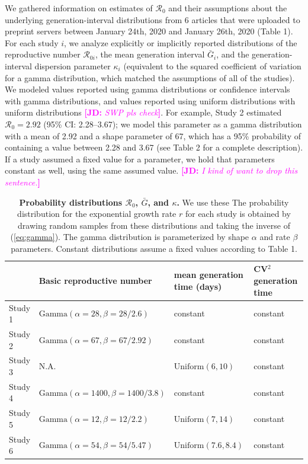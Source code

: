 \documentclass[12pt]{article}
\newcommand{\eref}[1]{(\ref{eq:#1})}
\newcommand{\comment}[3]{\textcolor{#1}{\textbf{[#2: }\textsl{#3}\textbf{]}}}
\newcommand{\jd}[1]{\comment{magenta}{JD}{#1}}
\begin{document}
We gathered information on estimates of $\mathcal R_0$ and their assumptions about the underlying generation-interval distributions from 6 articles that were uploaded to preprint servers between January 24th, 2020 and January 26th, 2020 (Table 1).
For each study $i$, we analyze explicitly or implicitly reported distributions of the reproductive number $\mathcal R_{0i}$, the mean generation interval $\bar G_i$, and the generation-interval dispersion parameter $\kappa_i$ (equivalent to the squared coefficient of variation for a gamma distribution, which matched the assumptions of all of the studies).
We modeled values reported using gamma distributions or confidence intervals with gamma distributions, and values reported using uniform distributions with uniform distributions \jd{SWP pls check}.
For example, Study 2 estimated $\mathcal R_0 = 2.92$ (95\% CI: 2.28--3.67);
we model this parameter as a gamma distribution with a mean of 2.92 and a shape parameter of 67, which has a 95\% probability of containing a value between 2.28 and 3.67 (see Table 2 for a complete description).
If a study assumed a fixed value for a parameter, we hold that parameters constant as well, using the same assumed value. \jd{I kind of want to drop this sentence.}

\begin{table}[t]
\begin{center}
\footnotesize
\begin{tabular}{l|l|l|l}
 & Basic reproductive number & mean generation time (days) & CV$^2$ generation time \\
\hline
Study 1 & $\mathrm{Gamma}(\alpha=28, \beta=28/2.6)$ & constant & constant \\
\hline
Study 2 & $\mathrm{Gamma}(\alpha=67, \beta=67/2.92)$ & constant & constant \\
\hline
Study 3 & N.A. & $\mathrm{Uniform}(6, 10)$ & constant\\
\hline
Study 4 & $\mathrm{Gamma}(\alpha=1400, \beta=1400/3.8)$ & constant & constant \\
\hline
Study 5 & $\mathrm{Gamma}(\alpha=12, \beta=12/2.2)$ & $\mathrm{Uniform}(7, 14)$ & constant\\
\hline
Study 6 & $\mathrm{Gamma}(\alpha=54, \beta=54/5.47)$ & $\mathrm{Uniform}(7.6, 8.4)$ & constant
\end{tabular}
\end{center}
\caption{
\textbf{Probability distributions $\mathcal R_0$, $\bar G$, and $\kappa$.}
We use these 
The probability distribution for the exponential growth rate $r$ for each study is obtained by drawing random samples from these distributions and taking the inverse of \eref{gamma}.
The gamma distribution is parameterized by shape $\alpha$ and rate $\beta$ parameters.
Constant distributions assume a fixed values according to Table 1.
}
\end{table}
\end{document}
